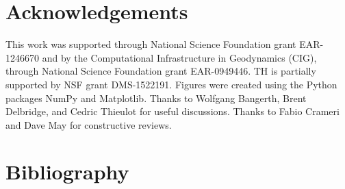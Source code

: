 \documentclass[preprint,12pt,authoryear]{elsarticle}
\begin{document}

\section*{Acknowledgements}
This work was supported through National Science Foundation grant EAR-1246670
and by the Computational Infrastructure in Geodynamics (CIG), through National Science Foundation grant EAR-0949446. 
TH is partially supported by NSF grant DMS-1522191.
Figures were created using the Python packages NumPy and Matplotlib.
Thanks to Wolfgang Bangerth, Brent Delbridge, and Cedric Thieulot for useful discussions.
Thanks to Fabio Crameri and Dave May for constructive reviews.




\nocite{hunter2007matplotlib}
\nocite{vanderwalt2011numpy}

\section*{Bibliography}
 






\end{document}
